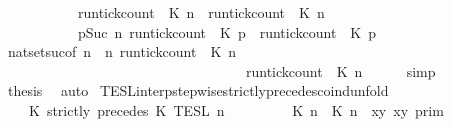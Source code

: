 \begin{isabellebody}
\ \ \ \ \ \ \ \ \ {\isacharequal}\ {\isacharbraceleft}{\isasymrho}{\isachardot}\ {\isacharparenleft}run{\isacharunderscore}tick{\isacharunderscore}count\ {\isasymrho}\ K\ n{\isacharparenright}\ {\isasymle}\ {\isacharparenleft}run{\isacharunderscore}tick{\isacharunderscore}count\ {\isasymrho}\ K\ n{\isacharparenright}{\isacharbraceright}\isanewline
\ \ \ \ \ \ \ \ \ {\isasyminter}\ {\isacharbraceleft}{\isasymrho}{\isachardot}\ {\isasymforall}p{\isasymge}Suc\ n{\isachardot}\ {\isacharparenleft}run{\isacharunderscore}tick{\isacharunderscore}count\ {\isasymrho}\ K\ p{\isacharparenright}\ {\isasymle}\ {\isacharparenleft}run{\isacharunderscore}tick{\isacharunderscore}count\ {\isasymrho}\ K\ p{\isacharparenright}{\isacharbraceright}{\isacartoucheclose}\isanewline
\ \ \ \ \isamarkupfalse%
\ nat{\isacharunderscore}set{\isacharunderscore}suc{\isacharbrackleft}of\ {\isacartoucheopen}n{\isacartoucheclose}\ {\isacartoucheopen}{\isasymlambda}{\isasymrho}\ n{\isachardot}\ {\isacharparenleft}run{\isacharunderscore}tick{\isacharunderscore}count\ {\isasymrho}\ K\ n{\isacharparenright}\isanewline
\ \ \ \ \ \ \ \ \ \ \ \ \ \ \ \ \ \ \ \ \ \ \ \ \ \ \ \ \ \ \ \ \ \ {\isasymle}\ {\isacharparenleft}run{\isacharunderscore}tick{\isacharunderscore}count\ {\isasymrho}\ K\ n{\isacharparenright}{\isacartoucheclose}{\isacharbrackright}\isanewline
\ \ \ \ \isamarkupfalse%
\ simp\isanewline
\ \ \isamarkupfalse%
\ {\isacharquery}thesis\ \isamarkupfalse%
\ auto\isanewline
{}\isamarkupfalse%
%
\endisatagproof
{\isafoldproof}%
%
\isadelimproof
\isanewline
%
\endisadelimproof
\isanewline
{}\isamarkupfalse%
\ TESL{\isacharunderscore}interp{\isacharunderscore}stepwise{\isacharunderscore}strictly{\isacharunderscore}precedes{\isacharunderscore}coind{\isacharunderscore}unfold{\isacharcolon}\isanewline
\ \ \ {\isacartoucheopen}{\isasymlbrakk}\ K\ strictly\ precedes\ K\ {\isasymrbrakk}\isactrlsub T\isactrlsub E\isactrlsub S\isactrlsub L\isactrlbsup {\isasymge}\ n\isactrlesup \ {\isacharequal}\isanewline
\ \ \ \ \ \ {\isasymlbrakk}\ {\isacharparenleft}{\isasymlceil}{\isacharhash}\isactrlsup {\isasymle}\ K\ n{\isacharcomma}\ {\isacharhash}\isactrlsup {\isacharless}\ K\ n{\isasymrceil}\ {\isasymin}\ {\isacharparenleft}{\isasymlambda}{\isacharparenleft}x{\isacharcomma}y{\isacharparenright}{\isachardot}\ x{\isasymle}y{\isacharparenright}{\isacharparenright}\ {\isasymrbrakk}\isactrlsub p\isactrlsub r\isactrlsub i\isactrlsub m\isanewline

\end{isabellebody}
